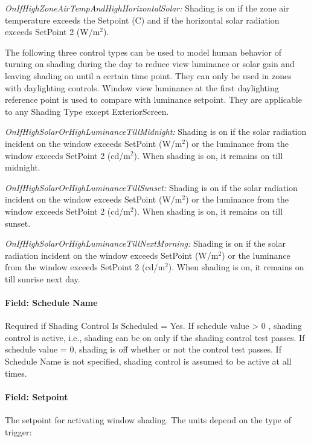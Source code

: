 \emph{OnIfHighZoneAirTempAndHighHorizontalSolar:} Shading is on if the zone air temperature exceeds the Setpoint (C) and if the horizontal solar radiation exceeds SetPoint 2 (W/m\(^{2}\)).

The following three control types can be used to model human behavior of turning on shading during the day to reduce view luminance or solar gain and leaving shading on until a certain time point. They can only be used in zones with daylighting controls. Window view luminance at the first daylighting reference point is used to compare with luminance setpoint. They are applicable to any Shading Type except ExteriorScreen.

\emph{OnIfHighSolarOrHighLuminanceTillMidnight:} Shading is on if the solar radiation incident on the window exceeds SetPoint (W/m\(^{2}\)) or the luminance from the window exceeds SetPoint 2 (cd/m\(^{2}\)). When shading is on, it remains on till midnight.

\emph{OnIfHighSolarOrHighLuminanceTillSunset:} Shading is on if the solar radiation incident on the window exceeds SetPoint (W/m\(^{2}\)) or the luminance from the window exceeds SetPoint 2 (cd/m\(^{2}\)). When shading is on, it remains on till sunset.

\emph{OnIfHighSolarOrHighLuminanceTillNextMorning:} Shading is on if the solar radiation incident on the window exceeds SetPoint (W/m\(^{2}\)) or the luminance from the window exceeds SetPoint 2 (cd/m\(^{2}\)). When shading is on, it remains on till sunrise next day.


\paragraph{Field: Schedule Name}\label{field-schedule-name-007}

Required if Shading Control Is Scheduled = Yes. If schedule value \textgreater{} 0 , shading control is active, i.e., shading can be on only if the shading control test passes. If schedule value = 0, shading is off whether or not the control test passes. If Schedule Name is not specified, shading control is assumed to be active at all times.

\paragraph{Field: Setpoint}\label{field-setpoint}

The setpoint for activating window shading. The units depend on the type of trigger:

